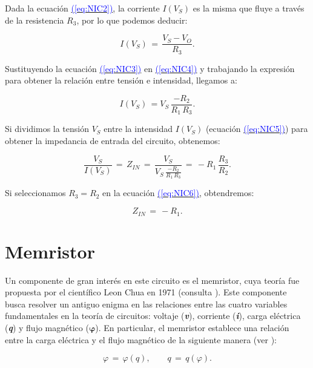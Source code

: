 \documentclass[12pt,a4paper]{report} %
\newcommand{\eref}[1]{\hyperref[#1]{\textcolor{blue}{(\ref*{#1})}}}
\newcommand{\eref}[1]{\hyperref[#1]{\textcolor{blue}{\textit{(\ref*{#1})}}}}
\begin{document}
	\noindent Dada la ecuación \eref{eq:NIC2}, la corriente $I(V_S)$ es la misma que fluye a través de la resistencia $R_3$, por lo que podemos deducir:
	
	\begin{equation}
		I(V_S)\,=\,\frac{V_S - V_O}{R_3}.
		\label{eq:NIC4}
	\end{equation}\smallskip
	
	\noindent Sustituyendo la ecuación \eref{eq:NIC3} en \eref{eq:NIC4} y trabajando la expresión para obtener la relación entre tensión e intensidad, llegamos a:
	
	\begin{equation}
		I(V_S)\,=V_S\,\frac{-R_2}{R_1 \, R_3}.
		\label{eq:NIC5}
	\end{equation}\smallskip
	
	\noindent Si dividimos la tensión $V_S$ entre la intensidad $I(V_S)$ (ecuación \eref{eq:NIC5}) para obtener la impedancia de entrada del circuito, obtenemos:
	
	\begin{equation}
		\frac{V_S}{I(V_S)}\,=\,Z_{IN}\,=\,\frac{V_S}{V_S\,\frac{-R_2}{R_1 \, R_3}}\,=\,-R_1\,\frac{R_3}{R_2}.
		\label{eq:NIC6}
	\end{equation}\smallskip
	
	\noindent Si seleccionamos $R_3 = R_2$ en la ecuación \eref{eq:NIC6}, obtendremos:
	
	\begin{equation}
		Z_{IN}\,=\,-R_1.
		\label{eq:NIC7}
	\end{equation}\smallskip
	
	\newpage
	\section{Memristor}
	\noindent Un componente de gran interés en este circuito es el memristor, cuya teoría fue propuesta por el científico Leon Chua en 1971 (consulta \cite{chuamissing1971}). Este componente busca resolver un antiguo enigma en las relaciones entre las cuatro variables fundamentales en la teoría de circuitos: voltaje (\textbf{\textit{v}}), corriente (\textbf{\textit{i}}), carga eléctrica (\textbf{\textit{q}}) y flujo magnético (\textit{$\bm{\varphi}$}). En particular, el memristor establece una relación entre la carga eléctrica y el flujo magnético de la siguiente manera (ver \cite{chuaoscillator2008}):
	
	\begin{equation}
		\varphi\,=\,\varphi(q), \qquad q\,=\,q(\varphi).
		\label{eq:flujocarga}
	\end{equation}\smallskip
	
\end{document}
